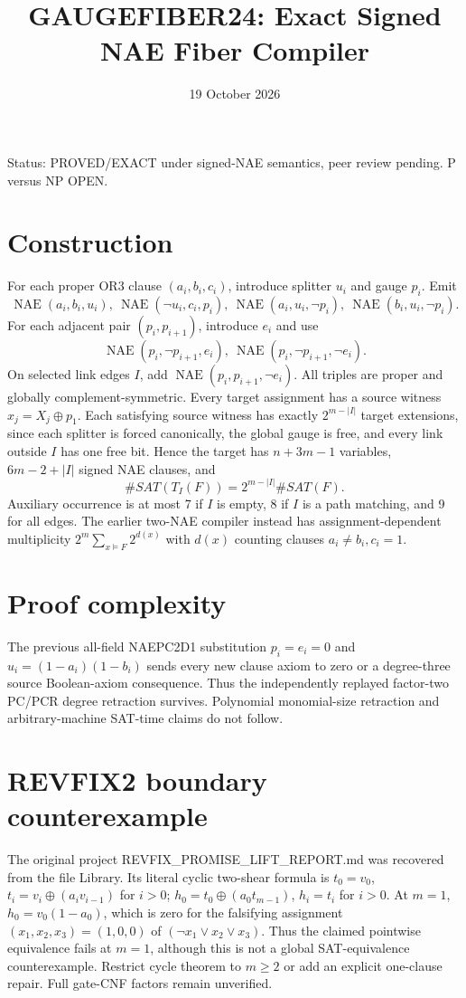 \documentclass{article}
\title{GAUGEFIBER24: Exact Signed NAE Fiber Compiler}
\date{19 October 2026}
\begin{document}
\maketitle
\noindent Status: PROVED/EXACT under signed-NAE semantics, peer review pending. P versus NP OPEN.

\section*{Construction}
For each proper OR3 clause $(a_i,b_i,c_i)$, introduce splitter $u_i$ and gauge $p_i$. Emit
\[
\operatorname{NAE}(a_i,b_i,u_i),\
\operatorname{NAE}(\neg u_i,c_i,p_i),\
\operatorname{NAE}(a_i,u_i,\neg p_i),\
\operatorname{NAE}(b_i,u_i,\neg p_i).
\]
For each adjacent pair $(p_i,p_{i+1})$, introduce $e_i$ and use
\[
\operatorname{NAE}(p_i,\neg p_{i+1},e_i),\
\operatorname{NAE}(p_i,\neg p_{i+1},\neg e_i).
\]
On selected link edges $I$, add $\operatorname{NAE}(p_i,p_{i+1},\neg e_i)$.
All triples are proper and globally complement-symmetric. Every target assignment has a source witness $x_j=X_j\oplus p_1$. Each satisfying source witness has exactly $2^{m-|I|}$ target extensions, since each splitter is forced canonically, the global gauge is free, and every link outside $I$ has one free bit.
Hence the target has $n+3m-1$ variables, $6m-2+|I|$ signed NAE clauses, and
\[
\boxed{\#SAT(T_I(F))=2^{m-|I|}\#SAT(F).}
\]
Auxiliary occurrence is at most 7 if $I$ is empty, 8 if $I$ is a path matching, and 9 for all edges. The earlier two-NAE compiler instead has assignment-dependent multiplicity $2^m\sum_{x\models F}2^{d(x)}$ with $d(x)$ counting clauses $a_i\ne b_i,c_i=1$.

\section*{Proof complexity}
The previous all-field NAEPC2D1 substitution $p_i=e_i=0$ and $u_i=(1-a_i)(1-b_i)$ sends every new clause axiom to zero or a degree-three source Boolean-axiom consequence. Thus the independently replayed factor-two PC/PCR degree retraction survives. Polynomial monomial-size retraction and arbitrary-machine SAT-time claims do not follow.

\section*{REVFIX2 boundary counterexample}
The original project REVFIX_PROMISE_LIFT_REPORT.md was recovered from the file Library. Its literal cyclic two-shear formula is $t_0=v_0$, $t_i=v_i\oplus(a_i v_{i-1})$ for $i>0$; $h_0=t_0\oplus(a_0 t_{m-1})$, $h_i=t_i$ for $i>0$. At $m=1$, $h_0=v_0(1-a_0)$, which is zero for the falsifying assignment $(x_1,x_2,x_3)=(1,0,0)$ of $(\neg x_1\vee x_2\vee x_3)$. Thus the claimed pointwise equivalence fails at $m=1$, although this is not a global SAT-equivalence counterexample. Restrict cycle theorem to $m\ge2$ or add an explicit one-clause repair. Full gate-CNF factors remain unverified.
\end{document}
